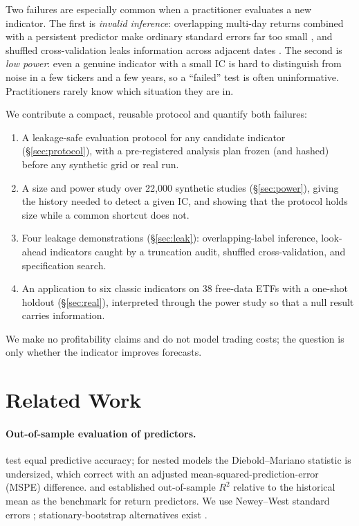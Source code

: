\documentclass[11pt]{article}
\begin{document}
Two failures are especially common when a practitioner evaluates a new indicator. The first is \emph{invalid inference}: overlapping multi-day returns combined with a persistent predictor make ordinary standard errors far too small \citep{hodrick1992,stambaugh1999}, and shuffled cross-validation leaks information across adjacent dates \citep{arlot2010,bergmeir2012}. The second is \emph{low power}: even a genuine indicator with a small IC is hard to distinguish from noise in a few tickers and a few years, so a ``failed'' test is often uninformative. Practitioners rarely know which situation they are in.

We contribute a compact, reusable protocol and quantify both failures:
\begin{enumerate}
\item A leakage-safe evaluation protocol for any candidate indicator (\S\ref{sec:protocol}), with a pre-registered analysis plan frozen (and hashed) before any synthetic grid or real run.
\item A size and power study over 22{,}000 synthetic studies (\S\ref{sec:power}), giving the history needed to detect a given IC, and showing that the protocol holds size while a common shortcut does not.
\item Four leakage demonstrations (\S\ref{sec:leak}): overlapping-label inference, look-ahead indicators caught by a truncation audit, shuffled cross-validation, and specification search.
\item An application to six classic indicators on 38 free-data ETFs with a one-shot holdout (\S\ref{sec:real}), interpreted through the power study so that a null result carries information.
\end{enumerate}
We make no profitability claims and do not model trading costs; the question is only whether the indicator improves forecasts.

\section{Related Work}
\paragraph{Out-of-sample evaluation of predictors.} \citet{diebold1995} test equal predictive accuracy; for nested models the Diebold--Mariano statistic is undersized, which \citet{clark2007} correct with an adjusted mean-squared-prediction-error (MSPE) difference. \citet{welch2008} and \citet{campbell2008} established out-of-sample $R^2$ relative to the historical mean as the benchmark for return predictors. We use Newey--West standard errors \citep{newey1987}; stationary-bootstrap alternatives exist \citep{politis1994}.
\end{document}
